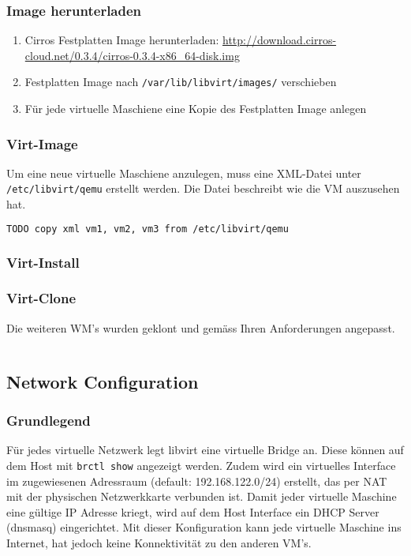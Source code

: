 \subsubsection{Image herunterladen}
\begin{enumerate}
	\item Cirros Festplatten Image herunterladen: \url{http://download.cirros-cloud.net/0.3.4/cirros-0.3.4-x86_64-disk.img}
	\item Festplatten Image nach \lstinline|/var/lib/libvirt/images/| verschieben
	\item Für jede virtuelle Maschiene eine Kopie des Festplatten Image anlegen
\end{enumerate}

\subsubsection{Virt-Image}
Um eine neue virtuelle Maschiene anzulegen, muss eine XML-Datei unter \lstinline|/etc/libvirt/qemu| erstellt werden. Die Datei beschreibt wie die VM auszusehen hat. 

\begin{lstlisting}[language=XML]
 TODO copy xml vm1, vm2, vm3 from /etc/libvirt/qemu
\end{lstlisting}

\subsubsection{Virt-Install}

\subsubsection{Virt-Clone}
Die weiteren WM's wurden geklont und gemäss Ihren Anforderungen angepasst.
\begin{lstlisting}[language=bash]

\end{lstlisting}


\subsection{Network Configuration}


\subsubsection{Grundlegend}
Für jedes virtuelle Netzwerk legt libvirt eine virtuelle Bridge an. Diese können auf dem Host mit \lstinline|brctl show| angezeigt werden. Zudem wird ein virtuelles Interface im zugewiesenen Adressraum (default: 192.168.122.0/24) erstellt, das per NAT mit der physischen Netzwerkkarte verbunden ist. Damit jeder virtuelle Maschine eine gültige IP Adresse kriegt, wird auf dem Host Interface ein DHCP Server (dnsmasq) eingerichtet. Mit dieser Konfiguration kann jede virtuelle Maschine ins Internet, hat jedoch keine Konnektivität zu den anderen VM's. 

